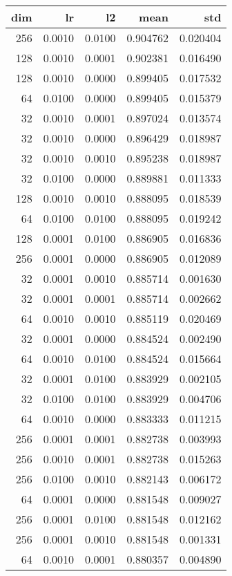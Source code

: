 \begin{tabular}{rrrrr}
\toprule
 dim &      lr &      l2 &      mean &       std \\
\midrule
 256 &  0.0010 &  0.0100 &  0.904762 &  0.020404 \\
 128 &  0.0010 &  0.0001 &  0.902381 &  0.016490 \\
 128 &  0.0010 &  0.0000 &  0.899405 &  0.017532 \\
  64 &  0.0100 &  0.0000 &  0.899405 &  0.015379 \\
  32 &  0.0010 &  0.0001 &  0.897024 &  0.013574 \\
  32 &  0.0010 &  0.0000 &  0.896429 &  0.018987 \\
  32 &  0.0010 &  0.0010 &  0.895238 &  0.018987 \\
  32 &  0.0100 &  0.0000 &  0.889881 &  0.011333 \\
 128 &  0.0010 &  0.0010 &  0.888095 &  0.018539 \\
  64 &  0.0100 &  0.0100 &  0.888095 &  0.019242 \\
 128 &  0.0001 &  0.0100 &  0.886905 &  0.016836 \\
 256 &  0.0001 &  0.0000 &  0.886905 &  0.012089 \\
  32 &  0.0001 &  0.0010 &  0.885714 &  0.001630 \\
  32 &  0.0001 &  0.0001 &  0.885714 &  0.002662 \\
  64 &  0.0010 &  0.0010 &  0.885119 &  0.020469 \\
  32 &  0.0001 &  0.0000 &  0.884524 &  0.002490 \\
  64 &  0.0010 &  0.0100 &  0.884524 &  0.015664 \\
  32 &  0.0001 &  0.0100 &  0.883929 &  0.002105 \\
  32 &  0.0100 &  0.0100 &  0.883929 &  0.004706 \\
  64 &  0.0010 &  0.0000 &  0.883333 &  0.011215 \\
 256 &  0.0001 &  0.0001 &  0.882738 &  0.003993 \\
 256 &  0.0010 &  0.0001 &  0.882738 &  0.015263 \\
 256 &  0.0100 &  0.0010 &  0.882143 &  0.006172 \\
  64 &  0.0001 &  0.0000 &  0.881548 &  0.009027 \\
 256 &  0.0001 &  0.0100 &  0.881548 &  0.012162 \\
 256 &  0.0001 &  0.0010 &  0.881548 &  0.001331 \\
  64 &  0.0010 &  0.0001 &  0.880357 &  0.004890 \\

\end{tabular}
